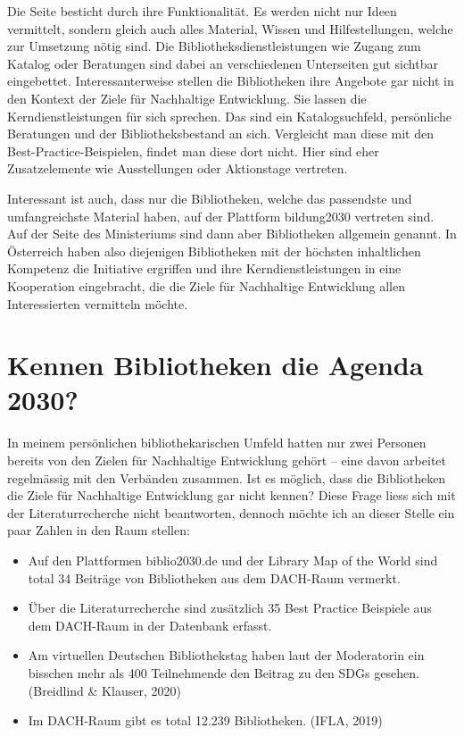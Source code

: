 \documentclass[a4paper,
fontsize=11pt,
oneside,
numbers=noperiodatend,
parskip=half-,
bibliography=totoc,
final
]{scrartcl}
\begin{document}
Die Seite besticht durch ihre Funktionalität. Es werden nicht nur Ideen
vermittelt, sondern gleich auch alles Material, Wissen und
Hilfestellungen, welche zur Umsetzung nötig sind. Die
Bibliotheksdienstleistungen wie Zugang zum Katalog oder Beratungen sind
dabei an verschiedenen Unterseiten gut sichtbar eingebettet.
Interessanterweise stellen die Bibliotheken ihre Angebote gar nicht in
den Kontext der Ziele für Nachhaltige Entwicklung. Sie lassen die
Kerndienstleistungen für sich sprechen. Das sind ein Katalogsuchfeld,
persönliche Beratungen und der Bibliotheksbestand an sich. Vergleicht
man diese mit den Best-Practice-Beispielen, findet man diese dort nicht.
Hier sind eher Zusatzelemente wie Ausstellungen oder Aktionstage
vertreten.

Interessant ist auch, dass nur die Bibliotheken, welche das passendste
und umfangreichste Material haben, auf der Plattform bildung2030
vertreten sind. Auf der Seite des Ministeriums sind dann aber
Bibliotheken allgemein genannt. In Österreich haben also diejenigen
Bibliotheken mit der höchsten inhaltlichen Kompetenz die Initiative
ergriffen und ihre Kerndienstleistungen in eine Kooperation eingebracht,
die die Ziele für Nachhaltige Entwicklung allen Interessierten
vermitteln möchte.

\hypertarget{kennen-bibliotheken-die-agenda-2030}{%
\section{Kennen Bibliotheken die Agenda
2030?}\label{kennen-bibliotheken-die-agenda-2030}}

In meinem persönlichen bibliothekarischen Umfeld hatten nur zwei
Personen bereits von den Zielen für Nachhaltige Entwicklung gehört --
eine davon arbeitet regelmässig mit den Verbänden zusammen. Ist es
möglich, dass die Bibliotheken die Ziele für Nachhaltige Entwicklung gar
nicht kennen? Diese Frage liess sich mit der Literaturrecherche nicht
beantworten, dennoch möchte ich an dieser Stelle ein paar Zahlen in den
Raum stellen:

\begin{itemize}
\tightlist
\item
  Auf den Plattformen biblio2030.de und der Library Map of the World
  sind total 34 Beiträge von Bibliotheken aus dem DACH-Raum vermerkt.
\item
  Über die Literaturrecherche sind zusätzlich 35 Best Practice Beispiele
  aus dem DACH-Raum in der Datenbank erfasst.
\item
  Am virtuellen Deutschen Bibliothekstag haben laut der Moderatorin ein
  bisschen mehr als 400 Teilnehmende den Beitrag zu den SDGs gesehen.
  (Breidlind \& Klauser, 2020)
\item
  Im DACH-Raum gibt es total 12.239 Bibliotheken. (IFLA, 2019)
\end{itemize}
\end{document}
